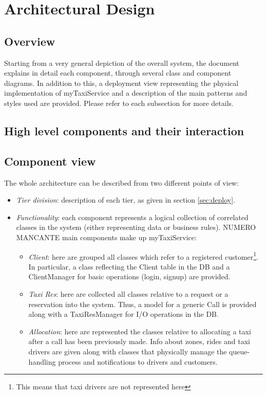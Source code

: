 \pagebreak
\section{Architectural Design}
 
\subsection{Overview}
Starting from a very general depiction of the overall system, the document explains in detail each component, through several class and component diagrams. In addition to this, a deployment view representing the physical implementation of myTaxiService and a description of the main patterns and styles used are provided. Please refer to each subsection for more details.

\subsection{High level components and their interaction}

\subsection{Component view}
The whole architecture can be described from two different points of view: 
\begin{itemize}
	\item \emph{Tier division}: description of each tier, as given in section \ref{sec:deploy}.
	\item \emph{Functionality}: each component represents a logical collection of correlated classes in the system (either representing data or business rules). NUMERO MANCANTE main components make up myTaxiService:
	\begin{itemize}
		\item \emph{Client}: here are grouped all classes which refer to a registered customer\footnote{This means that taxi drivers are not represented here}. In particular, a class reflecting the Client table in the DB and a ClientManager for basic operations (login, signup) are provided.
		\newpage
		\item \emph{Taxi Res}: here are collected all classes relative to a request or a reservation into the system. Thus, a model for a generic Call is provided along with a TaxiResManager for I/O operations in the DB.
		\newpage
		\item \emph{Allocation}: here are represented the classes relative to allocating a taxi after a call has been previously made. Info about zones, rides and taxi drivers are given along with classes that physically manage the queue-handling process and notifications to drivers and customers.
		\newpage
	\end{itemize}
\end{itemize}

